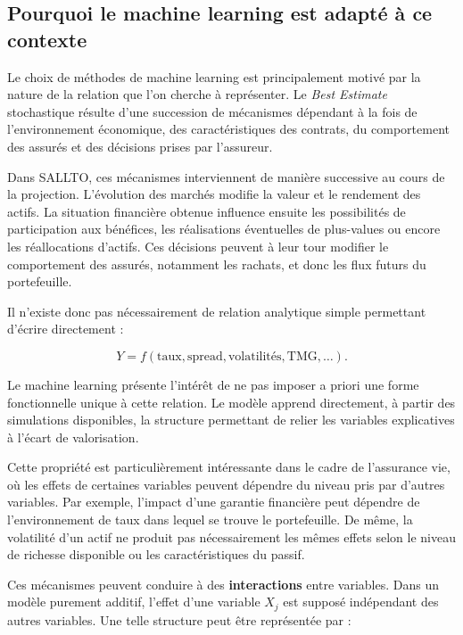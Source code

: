 \subsection{Pourquoi le machine learning est adapté à ce contexte}

Le choix de méthodes de machine learning est principalement motivé par la nature de la relation que l'on cherche à représenter. Le \textit{Best Estimate} stochastique résulte d'une succession de mécanismes dépendant à la fois de l'environnement économique, des caractéristiques des contrats, du comportement des assurés et des décisions prises par l'assureur.

Dans SALLTO, ces mécanismes interviennent de manière successive au cours de la projection. L'évolution des marchés modifie la valeur et le rendement des actifs. La situation financière obtenue influence ensuite les possibilités de participation aux bénéfices, les réalisations éventuelles de plus-values ou encore les réallocations d'actifs. Ces décisions peuvent à leur tour modifier le comportement des assurés, notamment les rachats, et donc les flux futurs du portefeuille.

Il n'existe donc pas nécessairement de relation analytique simple permettant d'écrire directement :

\begin{equation}
    Y =
    f(
    \text{taux},
    \text{spread},
    \text{volatilités},
    \text{TMG},
    \ldots
    ).
\end{equation}

Le machine learning présente l'intérêt de ne pas imposer a priori une forme fonctionnelle unique à cette relation. Le modèle apprend directement, à partir des simulations disponibles, la structure permettant de relier les variables explicatives à l'écart de valorisation.

Cette propriété est particulièrement intéressante dans le cadre de l'assurance vie, où les effets de certaines variables peuvent dépendre du niveau pris par d'autres variables. Par exemple, l'impact d'une garantie financière peut dépendre de l'environnement de taux dans lequel se trouve le portefeuille. De même, la volatilité d'un actif ne produit pas nécessairement les mêmes effets selon le niveau de richesse disponible ou les caractéristiques du passif.

Ces mécanismes peuvent conduire à des \textbf{interactions} entre variables. Dans un modèle purement additif, l'effet d'une variable $X_j$ est supposé indépendant des autres variables. Une telle structure peut être représentée par :

